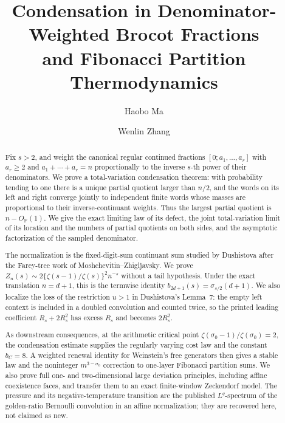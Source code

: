 \documentclass[12pt,reqno]{amsart}
\title[Brocot condensation and Fibonacci thermodynamics]{%
  Condensation in Denominator-Weighted Brocot Fractions\\
  and Fibonacci Partition Thermodynamics}
\author{Haobo Ma}
\author{Wenlin Zhang}
\date{}
\theoremstyle{plain}
\theoremstyle{remark}
\theoremstyle{definition}
\numberwithin{equation}{section}
\begin{document}
\begin{abstract}
Fix \(s>2\), and weight the canonical regular continued fractions
\([0;a_1,\ldots,a_r]\) with \(a_r\ge2\) and
\(a_1+\cdots+a_r=n\) proportionally to the inverse \(s\)-th power of their
denominators.  We prove a total-variation condensation theorem: with
probability tending to one there is a unique partial quotient larger than
\(n/2\), and the words on its left and right converge jointly to independent
finite words whose masses are proportional to their inverse-continuant
weights.  Thus the largest partial quotient is \(n-O_{\mathbb P}(1)\).  We
give the exact limiting law of its defect, the joint total-variation limit of
its location and the numbers of partial quotients on both sides, and the
asymptotic factorization of the sampled denominator.

The normalization is the fixed-digit-sum continuant sum studied by
Dushistova after the Farey-tree work of Moshchevitin--Zhigljavsky.  We prove
\(Z_n(s)\sim2\{\zeta(s-1)/\zeta(s)\}^2n^{-s}\) without a tail hypothesis.
Under the exact translation \(n=d+1\), this is the termwise identity
\(b_{2d+1}(s)=\sigma_{s/2}(d+1)\).  We also localize the loss of the
restriction \(u>1\) in Dushistova's Lemma~7: the empty left context is
included in a doubled convolution and counted twice, so the printed leading
coefficient \(R_s+2R_s^2\) has excess \(R_s\) and becomes \(2R_s^2\).

As downstream consequences, at the arithmetic critical point
\(\zeta(\sigma_0-1)/\zeta(\sigma_0)=2\), the condensation estimate supplies
the regularly varying cost law and the constant \(b_C=8\).  A weighted
renewal identity for Weinstein's free generators then gives a stable law and
the noninteger \(m^{3-\sigma_0}\) correction to one-layer Fibonacci
partition sums.  We also prove full one- and two-dimensional large deviation
principles, including affine coexistence faces, and transfer them to an exact
finite-window Zeckendorf model.  The pressure and its negative-temperature
transition are the published \(L^q\)-spectrum of the golden-ratio Bernoulli
convolution in an affine normalization; they are recovered here, not claimed
as new.
\end{abstract}

\maketitle











\end{document}
